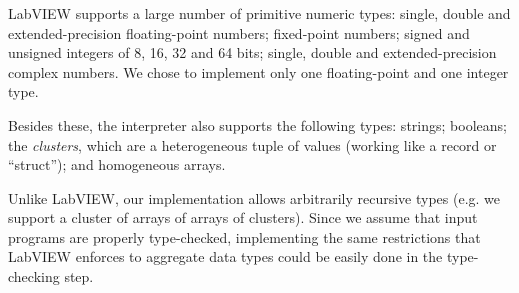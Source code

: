 \begin{hscode}\SaveRestoreHook
{}%
%
%
%
%
%
%
\>[B]{}\;\<[14]%
\>[14]{}\mathrel{=}{}\<[14E]%
\>[17]{}\;\<[E]%
\\
\>[14]{}\mid {}\<[14E]%
\>[17]{}\;\;\<[E]%
\\
\>[14]{}\mid {}\<[14E]%
\>[17]{}\<[E]%
\\
\>[14]{}\mid {}\<[14E]%
\>[17]{}\;\<[E]%
\\
\>[14]{}\mid {}\<[14E]%
\>[17]{}\;\<[E]%
\\
\>[B]{}\<[4]%
\>[4]{}\;\<[E]%
\\[\blanklineskip]%
\>[B]{}\;\<[19]%
\>[19]{}\mathrel{=}\<[E]%
\\
\>[19]{}\mid {}\<[E]%
\\
\>[19]{}\mid {}\<[E]%
\\
\>[19]{}\mid {}\<[E]%
\\
\>[B]{}\<[4]%
\>[4]{}\;\<[E]%
\ColumnHook
\end{hscode}\resethooks

LabVIEW supports a large number of primitive numeric types: single, double and
extended-precision floating-point numbers; fixed-point numbers; signed and
unsigned integers of 8, 16, 32 and 64 bits; single, double and
extended-precision complex numbers. We chose to implement only one
floating-point and one integer type.

Besides these, the interpreter also supports the following types: strings;
booleans; the \emph{clusters}, which are a heterogeneous tuple of values
(working like a record or ``struct''); and homogeneous arrays.

Unlike LabVIEW, our implementation allows arbitrarily recursive types (e.g. we
support a cluster of arrays of arrays of clusters). Since we assume that input
programs are properly type-checked, implementing the same restrictions that
LabVIEW enforces to aggregate data types could be easily done in the
type-checking step.

